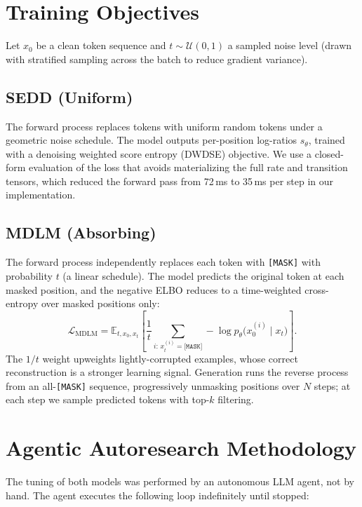 \documentclass[conference]{IEEEtran}
\begin{document}
\section{Training Objectives}
Let $x_0$ be a clean token sequence and $t\sim\mathcal{U}(0,1)$ a
sampled noise level (drawn with stratified sampling across the batch to
reduce gradient variance).

\subsection{SEDD (Uniform)}
The forward process replaces tokens with uniform random tokens under a
geometric noise schedule. The model outputs per-position log-ratios
$s_\theta$, trained with a denoising weighted score entropy (DWDSE)
objective. We use a closed-form evaluation of the loss that avoids
materializing the full rate and transition tensors, which reduced the
forward pass from 72\,ms to 35\,ms per step in our implementation.

\subsection{MDLM (Absorbing)}
The forward process independently replaces each token with
\texttt{[MASK]} with probability $t$ (a linear schedule). The model
predicts the original token at each masked position, and the negative
ELBO reduces to a time-weighted cross-entropy over masked positions
only:
\begin{equation}
\mathcal{L}_{\text{MDLM}} =
\mathbb{E}_{t, x_0, x_t}\!\left[
\frac{1}{t}\sum_{i:\,x_t^{(i)}=\texttt{[MASK]}}
-\log p_\theta\!\big(x_0^{(i)} \mid x_t\big)
\right].
\end{equation}
The $1/t$ weight upweights lightly-corrupted examples, whose correct
reconstruction is a stronger learning signal. Generation runs the
reverse process from an all-\texttt{[MASK]} sequence, progressively
unmasking positions over $N$ steps; at each step we sample predicted
tokens with top-$k$ filtering.

\section{Agentic Autoresearch Methodology}
The tuning of both models was performed by an autonomous LLM agent, not
by hand. The agent executes the following loop indefinitely until
stopped:
\end{document}
